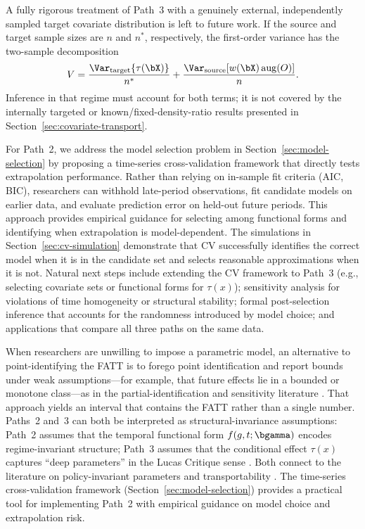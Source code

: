 \documentclass{article}
\begin{document}
A fully rigorous treatment of Path~3 with a genuinely external, independently sampled target covariate distribution is left to future work. If the source and target sample sizes are $n$ and $n^*$, respectively, the first-order variance has the two-sample decomposition
\[
V
=
\frac{\Var_{\mathrm{target}}\{\tau(\bX)\}}{n^*}
+
\frac{\Var_{\mathrm{source}}\!\left[
w(\bX)\operatorname{aug}(O)
\right]}{n}.
\]
Inference in that regime must account for both terms; it is not covered by the internally targeted or known/fixed-density-ratio results presented in Section~\ref{sec:covariate-transport}.

For Path~2, we address the model selection problem in Section~\ref{sec:model-selection} by proposing a time-series cross-validation framework that directly tests extrapolation performance. Rather than relying on in-sample fit criteria (AIC, BIC), researchers can withhold late-period observations, fit candidate models on earlier data, and evaluate prediction error on held-out future periods. This approach provides empirical guidance for selecting among functional forms and identifying when extrapolation is model-dependent. The simulations in Section~\ref{sec:cv-simulation} demonstrate that CV successfully identifies the correct model when it is in the candidate set and selects reasonable approximations when it is not. Natural next steps include extending the CV framework to Path~3 (e.g., selecting covariate sets or functional forms for $\tau(x)$); sensitivity analysis for violations of time homogeneity or structural stability; formal post-selection inference that accounts for the randomness introduced by model choice; and applications that compare all three paths on the same data.

When researchers are unwilling to impose a parametric model, an alternative to point-identifying the FATT is to forego point identification and report bounds under weak assumptions---for example, that future effects lie in a bounded or monotone class---as in the partial-identification and sensitivity literature \citep{manskiPublicPolicyUncertain2013}. That approach yields an interval that contains the FATT rather than a single number. Paths~2 and~3 can both be interpreted as structural-invariance assumptions: Path~2 assumes that the temporal functional form $f(g,t;\bgamma)$ encodes regime-invariant structure; Path~3 assumes that the conditional effect $\tau(x)$ captures ``deep parameters'' in the Lucas Critique sense \citep{lucasjrEconometricPolicyEvaluation1976}. Both connect to the literature on policy-invariant parameters and transportability \citep{heckmanStructuralEquationsTreatment2005,pearlExternalValidityCalculus2022}. The time-series cross-validation framework (Section~\ref{sec:model-selection}) provides a practical tool for implementing Path~2 with empirical guidance on model choice and extrapolation risk.
\end{document}
